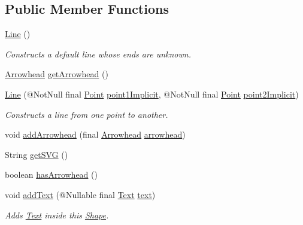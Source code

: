 \subsection*{Public Member Functions}
\begin{DoxyCompactItemize}
\item 
\hyperlink{classcom_1_1aarrelaakso_1_1drawl_1_1_line_af96a733c80d52bf419cab52fb09bc514}{Line} ()
\begin{DoxyCompactList}\small\item\em Constructs a default line whose ends are unknown. \end{DoxyCompactList}\item 
\hyperlink{classcom_1_1aarrelaakso_1_1drawl_1_1_arrowhead}{Arrowhead} \hyperlink{classcom_1_1aarrelaakso_1_1drawl_1_1_line_a9659e69575b1fd2bd2f6dbfc7e11521b}{get\+Arrowhead} ()
\item 
\hyperlink{classcom_1_1aarrelaakso_1_1drawl_1_1_line_a9e956655eba16543d82728923c3eb4f6}{Line} (@Not\+Null final \hyperlink{classcom_1_1aarrelaakso_1_1drawl_1_1_point}{Point} \hyperlink{classcom_1_1aarrelaakso_1_1drawl_1_1_line_a48220286707ae05387f9c99d9e08784c}{point1\+Implicit}, @Not\+Null final \hyperlink{classcom_1_1aarrelaakso_1_1drawl_1_1_point}{Point} \hyperlink{classcom_1_1aarrelaakso_1_1drawl_1_1_line_a055d1e743c66cc808f108664b38d7de2}{point2\+Implicit})
\begin{DoxyCompactList}\small\item\em Constructs a line from one point to another. \end{DoxyCompactList}\item 
void \hyperlink{classcom_1_1aarrelaakso_1_1drawl_1_1_line_a7c54922855fda2590c962ac8e03c220c}{add\+Arrowhead} (final \hyperlink{classcom_1_1aarrelaakso_1_1drawl_1_1_arrowhead}{Arrowhead} \hyperlink{classcom_1_1aarrelaakso_1_1drawl_1_1_line_a6a82ee992a758049f71dfbb22c597149}{arrowhead})
\item 
String \hyperlink{classcom_1_1aarrelaakso_1_1drawl_1_1_line_a6a54dd70515b691c8afa88f980e10698}{get\+S\+VG} ()
\item 
boolean \hyperlink{classcom_1_1aarrelaakso_1_1drawl_1_1_line_a422ac149cee14f3123989e44477d78d2}{has\+Arrowhead} ()
\item 
void \hyperlink{classcom_1_1aarrelaakso_1_1drawl_1_1_shape_af6fea9610721de462c18ee640043aba7}{add\+Text} (@Nullable final \hyperlink{classcom_1_1aarrelaakso_1_1drawl_1_1_text}{Text} \hyperlink{classcom_1_1aarrelaakso_1_1drawl_1_1_shape_ab54afc2d95d3447532f5ecf3fec3faa8}{text})
\begin{DoxyCompactList}\small\item\em Adds \hyperlink{classcom_1_1aarrelaakso_1_1drawl_1_1_text}{Text} inside this \hyperlink{classcom_1_1aarrelaakso_1_1drawl_1_1_shape}{Shape}. \end{DoxyCompactList}\item 

\end{DoxyCompactItemize}
